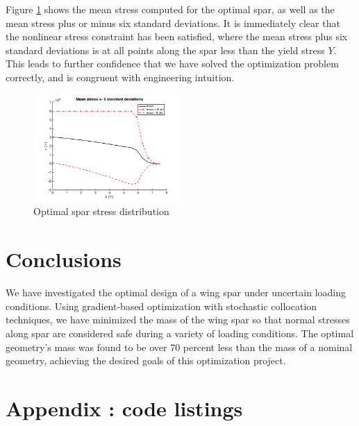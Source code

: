 \documentclass[10pt]{article}
\begin{document}
Figure \ref{fig:optimal_stress} shows the mean stress computed
for the optimal spar, as well as the mean stress plus or minus
six standard deviations. It is immediately clear that the
nonlinear stress constraint has been satisfied, where the
mean stress plus six standard deviations is at all points
along the spar less than the yield stress $Y$. This leads
to further confidence that
we have solved the optimization problem
correctly, and is congruent with engineering intuition.
%
\begin{figure}[hbt!]
\centering
\includegraphics[width=0.5\textwidth]{optimal_stress}
\caption{Optimal spar stress distribution}
\label{fig:optimal_stress}
\end{figure}

\section{Conclusions}

We have investigated the optimal design of a wing
spar under uncertain loading conditions. Using
gradient-based optimization with 
stochastic collocation techniques, we have minimized the mass of
the wing spar so that normal stresses along spar are
considered safe during a variety of loading conditions.
The optimal geometry's mass was found to be over 70
percent less than the mass of a nominal geometry,
achieving the desired goals of this optimization
project.

\newpage

\section{Appendix : code listings}


\newpage

\newpage

\newpage

\newpage

\end{document}
